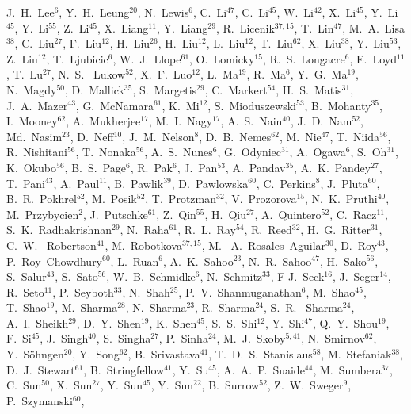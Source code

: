 {J.~H.~Lee$^{6}$,
Y.~H.~Leung$^{20}$,
N.~Lewis$^{6}$,
C.~Li$^{47}$,
C.~Li$^{45}$,
W.~Li$^{42}$,
X.~Li$^{45}$,
Y.~Li$^{45}$,
Y.~Li$^{55}$,
Z.~Li$^{45}$,
X.~Liang$^{11}$,
Y.~Liang$^{29}$,
R.~Licenik$^{37,15}$,
T.~Lin$^{47}$,
M.~A.~Lisa$^{38}$,
C.~Liu$^{27}$,
F.~Liu$^{12}$,
H.~Liu$^{26}$,
H.~Liu$^{12}$,
L.~Liu$^{12}$,
T.~Liu$^{62}$,
X.~Liu$^{38}$,
Y.~Liu$^{53}$,
Z.~Liu$^{12}$,
T.~Ljubicic$^{6}$,
W.~J.~Llope$^{61}$,
O.~Lomicky$^{15}$,
R.~S.~Longacre$^{6}$,
E.~Loyd$^{11}$,
T.~Lu$^{27}$,
N.~S.~ Lukow$^{52}$,
X.~F.~Luo$^{12}$,
L.~Ma$^{19}$,
R.~Ma$^{6}$,
Y.~G.~Ma$^{19}$,
N.~Magdy$^{50}$,
D.~Mallick$^{35}$,
S.~Margetis$^{29}$,
C.~Markert$^{54}$,
H.~S.~Matis$^{31}$,
J.~A.~Mazer$^{43}$,
G.~McNamara$^{61}$,
K.~Mi$^{12}$,
S.~Mioduszewski$^{53}$,
B.~Mohanty$^{35}$,
I.~Mooney$^{62}$,
A.~Mukherjee$^{17}$,
M.~I.~Nagy$^{17}$,
A.~S.~Nain$^{40}$,
J.~D.~Nam$^{52}$,
Md.~Nasim$^{23}$,
D.~Neff$^{10}$,
J.~M.~Nelson$^{8}$,
D.~B.~Nemes$^{62}$,
M.~Nie$^{47}$,
T.~Niida$^{56}$,
R.~Nishitani$^{56}$,
T.~Nonaka$^{56}$,
A.~S.~Nunes$^{6}$,
G.~Odyniec$^{31}$,
A.~Ogawa$^{6}$,
S.~Oh$^{31}$,
K.~Okubo$^{56}$,
B.~S.~Page$^{6}$,
R.~Pak$^{6}$,
J.~Pan$^{53}$,
A.~Pandav$^{35}$,
A.~K.~Pandey$^{27}$,
T.~Pani$^{43}$,
A.~Paul$^{11}$,
B.~Pawlik$^{39}$,
D.~Pawlowska$^{60}$,
C.~Perkins$^{8}$,
J.~Pluta$^{60}$,
B.~R.~Pokhrel$^{52}$,
M.~Posik$^{52}$,
T.~Protzman$^{32}$,
V.~Prozorova$^{15}$,
N.~K.~Pruthi$^{40}$,
M.~Przybycien$^{2}$,
J.~Putschke$^{61}$,
Z.~Qin$^{55}$,
H.~Qiu$^{27}$,
A.~Quintero$^{52}$,
C.~Racz$^{11}$,
S.~K.~Radhakrishnan$^{29}$,
N.~Raha$^{61}$,
R.~L.~Ray$^{54}$,
R.~Reed$^{32}$,
H.~G.~Ritter$^{31}$,
C.~W.~ Robertson$^{41}$,
M.~Robotkova$^{37,15}$,
M.~ A.~Rosales~Aguilar$^{30}$,
D.~Roy$^{43}$,
P.~Roy~Chowdhury$^{60}$,
L.~Ruan$^{6}$,
A.~K.~Sahoo$^{23}$,
N.~R.~Sahoo$^{47}$,
H.~Sako$^{56}$,
S.~Salur$^{43}$,
S.~Sato$^{56}$,
W.~B.~Schmidke$^{6}$,
N.~Schmitz$^{33}$,
F-J.~Seck$^{16}$,
J.~Seger$^{14}$,
R.~Seto$^{11}$,
P.~Seyboth$^{33}$,
N.~Shah$^{25}$,
P.~V.~Shanmuganathan$^{6}$,
M.~Shao$^{45}$,
T.~Shao$^{19}$,
M.~Sharma$^{28}$,
N.~Sharma$^{23}$,
R.~Sharma$^{24}$,
S.~R.~ Sharma$^{24}$,
A.~I.~Sheikh$^{29}$,
D.~Y.~Shen$^{19}$,
K.~Shen$^{45}$,
S.~S.~Shi$^{12}$,
Y.~Shi$^{47}$,
Q.~Y.~Shou$^{19}$,
F.~Si$^{45}$,
J.~Singh$^{40}$,
S.~Singha$^{27}$,
P.~Sinha$^{24}$,
M.~J.~Skoby$^{5,41}$,
N.~Smirnov$^{62}$,
Y.~S\"{o}hngen$^{20}$,
Y.~Song$^{62}$,
B.~Srivastava$^{41}$,
T.~D.~S.~Stanislaus$^{58}$,
M.~Stefaniak$^{38}$,
D.~J.~Stewart$^{61}$,
B.~Stringfellow$^{41}$,
Y.~Su$^{45}$,
A.~A.~P.~Suaide$^{44}$,
M.~Sumbera$^{37}$,
C.~Sun$^{50}$,
X.~Sun$^{27}$,
Y.~Sun$^{45}$,
Y.~Sun$^{22}$,
B.~Surrow$^{52}$,
Z.~W.~Sweger$^{9}$,
P.~Szymanski$^{60}$,
}
